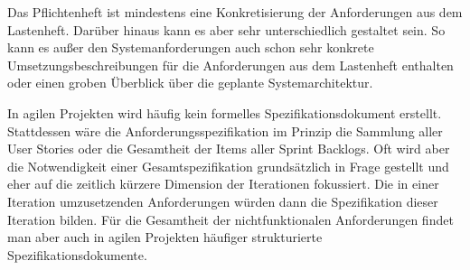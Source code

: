 Das Pflichtenheft 
ist mindestens eine Konkretisierung der Anforderungen aus dem Lastenheft. Darüber hinaus kann es aber sehr unterschiedlich gestaltet sein. So kann es außer den Systemanforderungen auch schon sehr konkrete Umsetzungsbeschreibungen für die Anforderungen aus dem Lastenheft enthalten oder einen groben Überblick über die geplante Systemarchitektur. 

In agilen Projekten wird häufig kein formelles Spezifikationsdokument erstellt. Stattdessen wäre die Anforderungsspezifikation im Prinzip die Sammlung aller User \mbox{Stories} oder die Gesamtheit der Items aller Sprint Backlogs. Oft wird aber die Notwendigkeit einer Gesamtspezifikation grundsätzlich in Frage gestellt und eher auf die zeitlich kürzere Dimension der Iterationen fokussiert. Die in einer Iteration umzusetzenden Anforderungen würden dann die Spezifikation dieser Iteration bilden. Für die Gesamtheit der nichtfunktionalen Anforderungen findet man aber auch in agilen Projekten häufiger strukturierte Spezifikationsdokumente.




